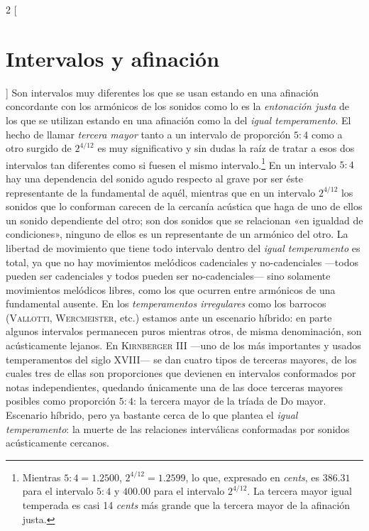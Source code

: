 \documentclass[a4paper,11pt]{article}
\begin{document}
\begin{multicols}{2}
[\section{Intervalos y afinación}\label{sec:intervalos-afinacion}]
  Son intervalos muy diferentes los que se usan estando en una afinación concordante con los armónicos de los sonidos como lo es la \emph{entonación justa} de los que se utilizan estando en una afinación como la del \emph{igual temperamento}. El hecho de llamar \emph{tercera mayor} tanto a un intervalo de proporción $5:4$ como a otro surgido de $2^{4/12}$ es muy significativo y sin dudas la raíz de tratar a esos dos intervalos tan diferentes como si fuesen el mismo intervalo.\footnote{Mientras $5:4=1.2500$, $2^{4/12}=1.2599$, lo que, expresado en \emph{cents}, es $386.31$ para el intervalo $5:4$ y $400.00$ para el intervalo $2^{4/12}$. La tercera mayor igual temperada es casi 14 \emph{cents} más grande que la tercera mayor de la afinación justa.} En un intervalo $5:4$ hay una dependencia del sonido agudo respecto al grave por ser éste representante de la fundamental de aquél, mientras que en un intervalo $2^{4/12}$ los sonidos que lo conforman carecen de la cercanía acústica que haga de uno de ellos un sonido dependiente del otro; son dos sonidos que se relacionan «en igualdad de condiciones», ninguno de ellos es un representante de un armónico del otro. La libertad de movimiento que tiene todo intervalo dentro del \emph{igual temperamento} es total, ya que no hay movimientos melódicos cadenciales y no-cadenciales ---todos pueden ser cadenciales y todos pueden ser no-cadenciales--- sino solamente movimientos melódicos libres, como los que ocurren entre armónicos de una fundamental ausente. En los \emph{temperamentos irregulares} como los barrocos (\textsc{Vallotti}, \textsc{Wercmeister}, etc.) estamos ante un escenario híbrido: en parte algunos intervalos permanecen puros mientras otros, de misma denominación, son acústicamente lejanos. En \textsc{Kirnberger III} ---uno de los más importantes y usados temperamentos del siglo XVIII--- se dan cuatro tipos de terceras mayores, de los cuales tres de ellas son proporciones que devienen en intervalos conformados por notas independientes, quedando únicamente una de las doce terceras mayores posibles como proporción $5:4$: la tercera mayor de la tríada de Do mayor. Escenario híbrido, pero ya bastante cerca de lo que plantea el \emph{igual temperamento}: la muerte de las relaciones interválicas conformadas por sonidos acústicamente cercanos.
\end{multicols}
\end{document}
